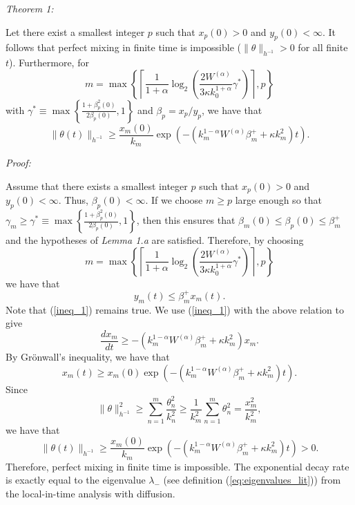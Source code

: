 \begin{flushleft}
{\it Theorem 1: }
\end{flushleft}
Let there exist a smallest integer $p$ such that $x_{p}(0)>0$ and $y_{p}(0)<\infty$.  It follows that perfect mixing in finite time is impossible ($\|\theta\|_{h^{-1}}>0$ for all finite $t$). Furthermore, for 
\begin{equation}
m=\max\left\{\left\lceil\frac{1}{1+\alpha}\log_{2}\left(\frac{2W^{(\alpha)}}{3\kappa k_{0}^{1+\alpha}}\gamma^{*} \right)\right\rceil, p \right\}
\end{equation}
with
$\gamma^{*}\equiv \max\left\{\frac{1+\beta_{p}^2(0)}{2\beta_{p}(0)},1\right\}$ and
 $\beta_{p}=x_{p}/y_{p}$, we have that
\begin{equation}
\|\theta(t)\|_{h^{-1}}\geq \frac{x_{m}(0)}{k_{m}} \exp(-(k_{m}^{1-\alpha}W^{(\alpha)}\beta_{m}^{+}+\kappa k_m^2)t).
\end{equation}

\begin{flushleft}
{\it Proof: }
\end{flushleft}
Assume that there exists a smallest integer $p$ such that $x_{p}(0)>0$ and $y_{p}(0)<\infty$. Thus, $\beta_{p}(0)<\infty$. If we choose $m\geq p$ large enough so that $\gamma_{m}\geq \gamma^{*}\equiv \max\left\{\frac{1+\beta_{p}^2(0)}{2\beta_{p}(0)},1\right\}$, then this ensures that $\beta_{m}(0)\leq \beta_{p}(0) \leq \beta_{m}^{+}$ and the hypotheses of {\it Lemma 1.a} are satisfied. Therefore, by choosing 
\begin{equation}
m=\max\left\{\left\lceil\frac{1}{1+\alpha}\log_{2}\left(\frac{2W^{(\alpha)}}{3\kappa k_{0}^{1+\alpha}}\gamma^{*} \right)\right\rceil, p \right\}
\end{equation}
 we have that
\begin{equation}
\label{eq:key_ineq}
y_{m}(t)\leq \beta_{m}^{+} x_{m}(t).
\end{equation}
Note that (\ref{ineq_1}) remains true. We use (\ref{ineq_1}) with the above relation to give
\begin{equation}
\frac{dx_{m}}{dt} \geq - (k_{m}^{1-\alpha}W^{(\alpha)}\beta_{m}^{+}+\kappa k_m^2)x_{m} . 
\end{equation}
By Gr\"onwall's inequality, we have that
\begin{equation}
x_{m}(t)\geq x_{m}(0) \exp(-(k_{m}^{1-\alpha}W^{(\alpha)}\beta_{m}^{+}+\kappa k_m^2)t).
\end{equation}
Since 
\begin{equation}
\|\theta\|_{h^{-1}}^{2} \geq  \sum_{n=1}^{m}\frac{\theta^2_{n}}{k_{n}^2}  \geq \frac{1}{k_{m}^{2}} \sum_{n=1}^{m}\theta^2_{n} = \frac{x_{m}^2}{k_m^2},
\end{equation}
we have that 
\begin{equation}
\|\theta(t)\|_{h^{-1}}\geq \frac{x_{m}(0)}{k_{m}} \exp(-(k_{m}^{1-\alpha}W^{(\alpha)}\beta_{m}^{+}+\kappa k_m^2)t)>0.
\end{equation}
Therefore, perfect mixing in finite time is impossible. The exponential decay rate is exactly equal to the eigenvalue $\lambda_{-}$ (see definition (\ref{eq:eigenvalues_lit})) from the local-in-time analysis with diffusion.

